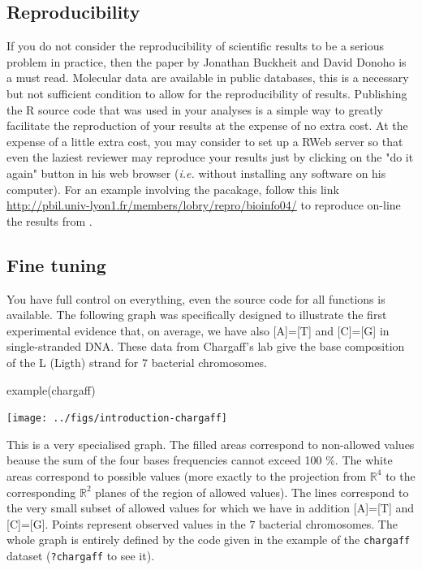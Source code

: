 \documentclass{article}
\begin{document}
\subsection{Reproducibility} 
If you do not consider the reproducibility of scientific results
to be a serious problem in practice, then the paper by Jonathan Buckheit and David Donoho
\cite{repro} is a must read. Molecular data are available in public databases, this is
a necessary but not sufficient condition to allow for the reproducibility of results.
Publishing the R source code that was used in your analyses is a simple way
to greatly facilitate the reproduction of your results at the expense of no extra cost. 
At the expense of a little extra cost, you may consider to set up a RWeb server
so that even the laziest reviewer may reproduce your results just by clicking on
the "do it again" button in his web browser (\textit{i.e.} without installing any
software on his computer). For an example involving the \seqinr{} pacakage, 
follow this link \url{http://pbil.univ-lyon1.fr/members/lobry/repro/bioinfo04/}
to reproduce on-line the results from \cite{fifine}.

\subsection{Fine tuning} 
You have full control on everything, even the source code
for all functions is available. 
The following graph was specifically designed to illustrate
the first experimental evidence \cite{chargaff} that, on average, we have also [A]=[T] and [C]=[G] 
in single-stranded DNA. These data from Chargaff's lab give the base composition of the L (Ligth) 
strand for 7 bacterial chromosomes.

\begin{Schunk}
\begin{Sinput}
 example(chargaff)
\end{Sinput}
\end{Schunk}
\texttt{[image: ../figs/introduction-chargaff]}

This is a very specialised graph. The filled areas correspond to non-allowed values beause the sum 
of the four bases frequencies cannot exceed 100 \%. The white areas correspond to possible values 
(more exactly to the projection from $\mathbb{R}^4$ to the corresponding $\mathbb{R}^2$ 
planes of the region of allowed values). The lines correspond to the very small subset of allowed 
values for which we have in addition [A]=[T] and [C]=[G]. Points represent observed values in
the $7$ bacterial chromosomes. The whole graph is entirely defined by the code given in the
example of the \texttt{chargaff} dataset (\texttt{?chargaff} to see it).
\end{document}
